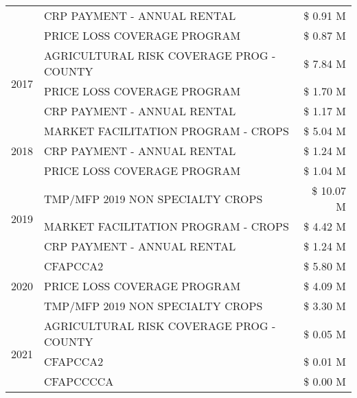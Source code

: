 \begin{tabular}{llr}
 & CRP PAYMENT - ANNUAL RENTAL & \$ 0.91 M \\
 & PRICE LOSS COVERAGE PROGRAM & \$ 0.87 M \\
\cline{1-3}
\multirow[t]{3}{*}{2017} & AGRICULTURAL RISK COVERAGE PROG - COUNTY & \$ 7.84 M \\
 & PRICE LOSS COVERAGE PROGRAM & \$ 1.70 M \\
 & CRP PAYMENT - ANNUAL RENTAL & \$ 1.17 M \\
\cline{1-3}
\multirow[t]{3}{*}{2018} & MARKET FACILITATION PROGRAM - CROPS & \$ 5.04 M \\
 & CRP PAYMENT - ANNUAL RENTAL & \$ 1.24 M \\
 & PRICE LOSS COVERAGE PROGRAM & \$ 1.04 M \\
\cline{1-3}
\multirow[t]{3}{*}{2019} & TMP/MFP 2019 NON SPECIALTY CROPS & \$ 10.07 M \\
 & MARKET FACILITATION PROGRAM - CROPS & \$ 4.42 M \\
 & CRP PAYMENT - ANNUAL RENTAL & \$ 1.24 M \\
\cline{1-3}
\multirow[t]{3}{*}{2020} & CFAPCCA2 & \$ 5.80 M \\
 & PRICE LOSS COVERAGE PROGRAM & \$ 4.09 M \\
 & TMP/MFP 2019 NON SPECIALTY CROPS & \$ 3.30 M \\
\cline{1-3}
\multirow[t]{3}{*}{2021} & AGRICULTURAL RISK COVERAGE PROG - COUNTY & \$ 0.05 M \\
 & CFAPCCA2 & \$ 0.01 M \\
 & CFAPCCCCA & \$ 0.00 M \\
\cline{1-3}
\bottomrule
\end{tabular}
